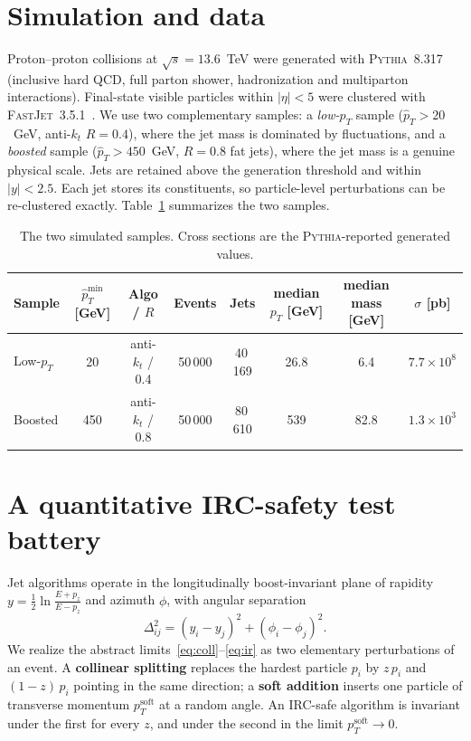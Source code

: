 \documentclass[11pt]{article}
\newcommand{\kt}{k_{t}}
\newcommand{\antikt}{anti-$\kt$}
\newcommand{\pt}{p_{T}}
\newcommand{\ptsoft}{p_{T}^{\mathrm{soft}}}
\begin{document}
\section{Simulation and data}
Proton--proton collisions at $\sqrt{s}=13.6$~TeV were generated with
\textsc{Pythia}~8.317~\cite{pythia} (inclusive hard QCD, full parton shower, hadronization
and multiparton interactions). Final-state visible particles within $|\eta|<5$ were
clustered with \textsc{FastJet}~3.5.1~\cite{fastjet}. We use two complementary samples:
a \emph{low-$\pt$} sample ($\hat p_T>20$~GeV, \antikt{} $R=0.4$), where the jet mass is
dominated by fluctuations, and a \emph{boosted} sample ($\hat p_T>450$~GeV, $R=0.8$ fat
jets), where the jet mass is a genuine physical scale. Jets are retained above the
generation threshold and within $|y|<2.5$. Each jet stores its constituents, so
particle-level perturbations can be re-clustered exactly. Table~\ref{tab:samples}
summarizes the two samples.

\begin{table}[h]
\centering
\caption{The two simulated samples. Cross sections are the \textsc{Pythia}-reported
generated values.}
\label{tab:samples}
\small
\begin{tabular}{lccccccc}
\toprule
Sample & $\hat p_T^{\min}$ [GeV] & Algo / $R$ & Events & Jets &
median $\pt$ [GeV] & median mass [GeV] & $\sigma$ [pb] \\
\midrule
Low-$\pt$ & 20  & \antikt{} / 0.4 & 50\,000 & 40\,169 & 26.8 & 6.4  & $7.7\times10^{8}$ \\
Boosted   & 450 & \antikt{} / 0.8 & 50\,000 & 80\,610 & 539  & 82.8 & $1.3\times10^{3}$ \\
\bottomrule
\end{tabular}
\end{table}

\section{A quantitative IRC-safety test battery}
Jet algorithms operate in the longitudinally boost-invariant plane of rapidity
$y=\tfrac12\ln\frac{E+p_z}{E-p_z}$ and azimuth $\phi$, with angular separation
\begin{equation}
\Delta_{ij}^{2} = (y_i-y_j)^2 + (\phi_i-\phi_j)^2 .
\label{eq:dr}
\end{equation}
We realize the abstract limits~\eqref{eq:coll}--\eqref{eq:ir} as two elementary
perturbations of an event. A \textbf{collinear splitting} replaces the hardest particle
$p_i$ by $z\,p_i$ and $(1{-}z)\,p_i$ pointing in the same direction; a \textbf{soft
addition} inserts one particle of transverse momentum $\ptsoft$ at a random angle. An
IRC-safe algorithm is invariant under the first for every $z$, and under the second in the
limit $\ptsoft\to0$.
\end{document}
